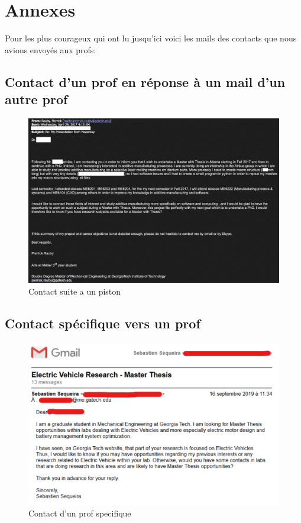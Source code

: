 \documentclass{article}
\begin{document}
\section{Annexes}
Pour les plus courageux qui ont lu jusqu'ici voici les mails des contacts que nous avions envoyés aux profs: 

\subsection{Contact d'un prof en réponse à un mail d'un autre prof}
\begin{figure}[h]
\begin{center}
\includegraphics[width=14cm]{mail_Pierrick.png} 
\end{center}
\caption{Contact suite a un piston}
\label{Contact suite a un piston}
\end{figure}
\newpage
\subsection{Contact spécifique vers un prof}
\begin{figure}[h]
\begin{center}
\includegraphics[width=14cm]{Electric_vehicle.png} 
\end{center}
\caption{Contact d'un prof specifique}
\label{Contact d'un prof specifique}
\end{figure}
\newpage
\end{document}
